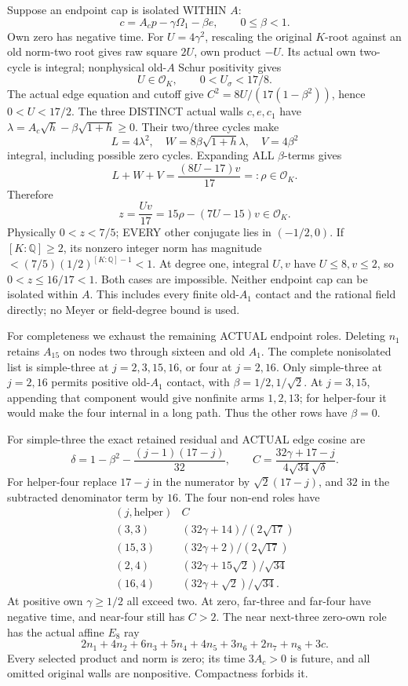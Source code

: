 \documentclass[11pt]{article}
\begin{document}
Suppose an endpoint cap is isolated
WITHIN \(A\):
\[
 c=A_cp-\gamma\Omega_1-\beta e,\qquad0\le\beta<1 .
\]
Own zero has negative time.
For \(U=4\gamma^2\), rescaling the
original \(K\)-root against an old
norm-two root gives raw square \(2U\),
own product \(-U\).
Its actual own two-cycle is integral;
nonphysical old-\(A\) Schur positivity gives
\[
               U\in\mathcal O_K,\qquad0<U_\sigma<17/8 .
\]
The actual edge equation and cutoff give
\(C^2=8U/(17(1-\beta^2))\), hence \(0<U<17/2\).
The three DISTINCT actual walls \(c,e,c_1\)
have \(\lambda=A_c\sqrt h-\beta\sqrt{1+h}\ge0\).
Their two/three cycles make
\[
             L=4\lambda^2,\quad
             W=8\beta\sqrt{1+h}\lambda,\quad
             V=4\beta^2
\]
integral, including possible zero cycles.
Expanding ALL \(\beta\)-terms gives
\[
                  L+W+V={\frac{(8U-17)v}{17}}=:\rho\in\mathcal O_K .
\]
Therefore
\[
                    z={\frac{Uv}{17}}=15\rho-(7U-15)v
                                              \in\mathcal O_K .
\]
Physically \(0<z<7/5\); EVERY other
conjugate lies in \((-1/2,0)\).
If \([K:\mathbb Q]\ge2\), its nonzero
integer norm has magnitude
\(<(7/5)(1/2)^{[K:\mathbb Q]-1}<1\).
At degree one, integral \(U,v\) have
\(U\le8,v\le2\), so \(0<z\le16/17<1\).
Both cases are impossible.
Neither endpoint cap can be isolated
within \(A\).
This includes every finite old-\(A_1\)
contact and the rational field directly;
no Meyer or field-degree bound is used.

For completeness we exhaust the remaining
ACTUAL endpoint roles.
Deleting \(n_1\) retains \(A_{15}\)
on nodes two through sixteen and old
\(A_1\).
The complete nonisolated list is
simple-three at \(j=2,3,15,16\), or
four at \(j=2,16\).
Only simple-three at \(j=2,16\)
permits positive old-\(A_1\) contact,
with \(\beta=1/2,1/\sqrt2\).
At \(j=3,15\), appending that component
would give nonfinite arms \(1,2,13\);
for helper-four it would make the
four internal in a long path.
Thus the other rows have \(\beta=0\).

For simple-three the exact retained residual
and ACTUAL edge cosine are
\[
 \delta=1-\beta^2-{\frac{(j-1)(17-j)}{32}},\qquad
 C={\frac{32\gamma+17-j}{4\sqrt{34}\sqrt\delta}}.
\]
For helper-four replace \(17-j\) in
the numerator by \(\sqrt2(17-j)\), and
\(32\) in the subtracted denominator term
by \(16\).
The four non-end roles have
\[
 \begin{array}{c|c}
 (j,\text{helper})&C\\ \hline
 (3,3)&(32\gamma+14)/(2\sqrt{17})\\
 (15,3)&(32\gamma+2)/(2\sqrt{17})\\
 (2,4)&(32\gamma+15\sqrt2)/\sqrt{34}\\
 (16,4)&(32\gamma+\sqrt2)/\sqrt{34}.
 \end{array}
\]
At positive own \(\gamma\ge1/2\) all
exceed two.
At zero, far-three and far-four have
negative time, and near-four still
has \(C>2\).
The near next-three zero-own role has
the actual affine \(E_8\) ray
\[
              2n_1+4n_2+6n_3+5n_4+4n_5+3n_6+2n_7+n_8+3c .
\]
Every selected product and norm is zero;
its time \(3A_c>0\) is future, and
all omitted original walls are nonpositive.
Compactness forbids it.
\end{document}

